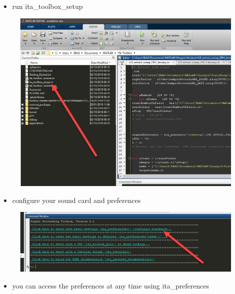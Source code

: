 \documentclass[12pt, a4paper, twoside, onecolumn]{article}%
\begin{document}
 

\setcounter{page}{1}








\pagebreak
\begin{itemize}
    \item run ita\_toolbox\_setup
\end{itemize}

\begin{figure}[H]\centering
\includegraphics[width=.7\textwidth]{Figures/f1.jpg}
\end{figure}

\begin{itemize}
    \item configure your sound card and preferences
\end{itemize}

\begin{figure}[H]\centering
\includegraphics[width=.7\textwidth]{Figures/f2.jpg}
\end{figure}

\begin{itemize}
    \item you can access the preferences at any time using ita\_preferences
\end{itemize}
\end{document}

